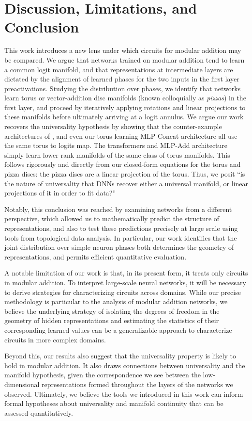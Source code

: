 \section{Discussion, Limitations, and Conclusion}
\label{sec:discussion-conclusion}
This work introduces a new lens under which circuits for modular addition may be compared.
We argue that networks trained on modular addition tend to learn a common logit manifold, and that representations at intermediate layers are dictated by the alignment of learned phases for the two inputs in the first layer preactivations.
Studying the distribution over phases, we identify that networks learn torus or vector-addition disc manifolds (known colloquially as \emph{pizzas}) in the first layer, and proceed by iteratively applying rotations and linear projections to these manifolds before ultimately arriving at a logit annulus. We argue our work recovers the universality hypothesis by showing that the counter-example architectures of \cite{zhong2023the}, and even our torus-learning MLP-Concat architecture all use the same torus to logits map. The transformers and MLP-Add architecture simply learn lower rank manifolds of the same class of torus manifolds. This follows rigorously and directly from our closed-form equations for the torus and pizza discs: the pizza discs are a linear projection of the torus. Thus, we posit ``is the nature of universality that DNNs recover either a universal manifold, or linear projections of it in order to fit data?'' 

Notably, this conclusion was reached by examining networks from a different perspective, which allowed us to mathematically predict the structure of representations, and also to test these predictions precisely at large scale using tools from topological data analysis. In particular, our work identifies that the joint distribution over simple neuron phases both determines the geometry of representations, and permits efficient quantitative evaluation.

A notable limitation of our work is that, in its present form, it treats only circuits in modular addition.
To interpret large-scale neural networks, it will be necessary to derive strategies for characterizing circuits across domains.
While our precise methodology is particular to the analysis of modular addition networks, we believe the underlying strategy of isolating the degrees of freedom in the geometry of hidden representations and estimating the statistics of their corresponding learned values can be a generalizable approach to characterize circuits in more complex domains.

Beyond this, our results also suggest that the universality property is likely to hold in modular addition.
It also draws connections between universality and the manifold hypothesis, given the correspondence we see between the low-dimensional representations formed throughout the layers of the networks we observed.
Ultimately, we believe the tools we introduced in this work can inform formal hypotheses about universality and manifold continuity that can be assessed quantitatively.